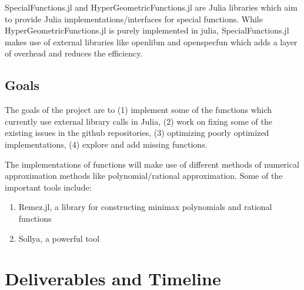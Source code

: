 \documentclass{article}
\theoremstyle{mytheoremstyle}
\theoremstyle{mytheoremstyle}
\theoremstyle{myproblemstyle}
\begin{document}
    SpecialFunctions.jl and HyperGeometricFunctions.jl are Julia libraries which aim to provide Julia implementations/interfaces for special functions.
    While HyperGeometricFunctions.jl is purely implemented in julia, SpecialFunctions.jl makes use of external libraries like openlibm and openspecfun which adds a layer of overhead and reduces the efficiency.



    
    \subsection*{Goals}\label{sub:Goals} %
      The goals of the project are to (1) implement some of the functions which currently use external library calls in Julia, (2) work on fixing some of the existing issues in the github repositories, (3) optimizing poorly optimized implementations, (4) explore and add missing functions. 

      The implementations of functions will make use of different methods  of numerical approximation methods like polynomial/rational approximation. 
      Some of the important tools include: \begin{enumerate}
        \item Remez.jl, a library for constructing minimax polynomials and rational functions 
        \item Sollya, a powerful tool 
      \end{enumerate}
    
  \section*{Deliverables and Timeline}\label{sec:Methods} %
\end{document}
